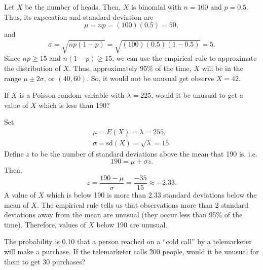 \documentclass[11pt]{exam}
\begin{document}
\begin{questions}

\begin{solution}
Let $X$ be the number of heads.  Then, $X$ is binomial with $n = 100$ and $p =
0.5$.  Thus, its expecation and standard deviation are
\[
  \mu = n p  = (100) (0.5) = 50,
\]
and
\[
  \sigma = \sqrt{n p (1 - p)} = \sqrt{(100) (0.5) (1 - 0.5)} = 5.
\]
Since $n p \geq 15$ and $n (1 - p) \geq 15$, we can use the empirical rule to
approximate the distribution of $X$.  Thus, approximately 95\% of the time,
$X$ will be in the range $\mu \pm 2 \sigma$, or $(40, 60)$.  So, it would not
be unusual get observe $X = 42$.

\end{solution}


\question If $X$ is a Poisson random variable with $\lambda = 225$, would it be
unusual to get a value of $X$ which is less than 190?

\begin{solution}
Set
\begin{gather*}
  \mu = E(X) = \lambda = 255, \\
  \sigma = \mathrm{sd}(X) = \sqrt{\lambda} = 15.
\end{gather*}
Define $z$ to be the number of standard deviations above the mean that 190 is,
i.e.
\[
  190 = \mu + \sigma z.
\]
Then,
\[
  z = \frac{190 - \mu}{\sigma} = \frac{-35}{15} \approx -2.33.
\]
A value of $X$ which is below 190 is more than 2.33 standard deviations
below the mean of $X$.  The empirical rule tells us that observations more
than 2 standard deviations away from the mean are unusual (they occur less
than 95\% of the time).  Therefore, values
of $X$ below 190 are unusual.
\end{solution}



\question The probability is 0.10 that a person reached on a ``cold call'' by
a telemarketer will make a purchase.  If the telemarketer calls 200 people,
would it be unusual for them to get 30 purchases?


\end{questions}
\end{document}
